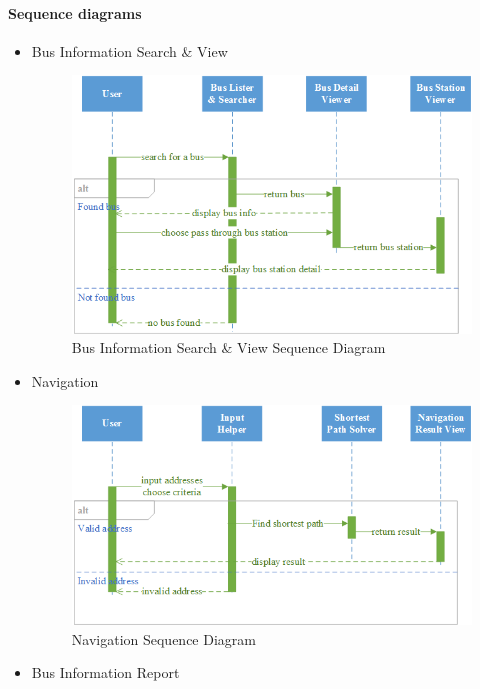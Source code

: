 		\paragraph{Sequence diagrams}
			\begin{itemize}
				\item{Bus Information Search \& View}
					\begin{figure}[H]
					\centering
					\includegraphics[scale=5]{Chapters/Fig/bus-search-and-view-sd.png}
					\caption{Bus Information Search \& View Sequence Diagram}
					\label{fig:bus_view_sd}
					\end{figure}
				\item{Navigation}
					\begin{figure}[H]
					\centering
					\includegraphics[scale=5]{Chapters/Fig/navigate-sd.png}
					\caption{Navigation Sequence Diagram}
					\label{fig:navigate_sd}
					\end{figure}
				\item{Bus Information Report}
					\begin{figure}[H]

\end{figure}
\end{itemize}
